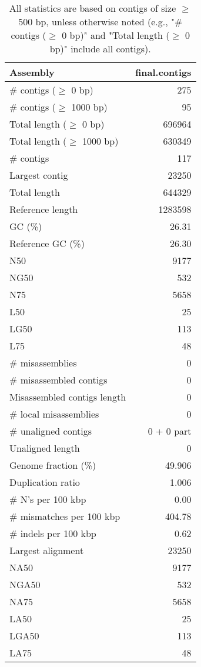 \documentclass[12pt,a4paper]{article}
\begin{document}
\begin{table}[ht]
\begin{center}
\caption{All statistics are based on contigs of size $\geq$ 500 bp, unless otherwise noted (e.g., "\# contigs ($\geq$ 0 bp)" and "Total length ($\geq$ 0 bp)" include all contigs).}
\begin{tabular}{|l*{1}{|r}|}
\hline
Assembly & final.contigs \\ \hline
\# contigs ($\geq$ 0 bp) & 275 \\ \hline
\# contigs ($\geq$ 1000 bp) & 95 \\ \hline
Total length ($\geq$ 0 bp) & 696964 \\ \hline
Total length ($\geq$ 1000 bp) & 630349 \\ \hline
\# contigs & 117 \\ \hline
Largest contig & 23250 \\ \hline
Total length & 644329 \\ \hline
Reference length & 1283598 \\ \hline
GC (\%) & 26.31 \\ \hline
Reference GC (\%) & 26.30 \\ \hline
N50 & 9177 \\ \hline
NG50 & 532 \\ \hline
N75 & 5658 \\ \hline
L50 & 25 \\ \hline
LG50 & 113 \\ \hline
L75 & 48 \\ \hline
\# misassemblies & 0 \\ \hline
\# misassembled contigs & 0 \\ \hline
Misassembled contigs length & 0 \\ \hline
\# local misassemblies & 0 \\ \hline
\# unaligned contigs & 0 + 0 part \\ \hline
Unaligned length & 0 \\ \hline
Genome fraction (\%) & 49.906 \\ \hline
Duplication ratio & 1.006 \\ \hline
\# N's per 100 kbp & 0.00 \\ \hline
\# mismatches per 100 kbp & 404.78 \\ \hline
\# indels per 100 kbp & 0.62 \\ \hline
Largest alignment & 23250 \\ \hline
NA50 & 9177 \\ \hline
NGA50 & 532 \\ \hline
NA75 & 5658 \\ \hline
LA50 & 25 \\ \hline
LGA50 & 113 \\ \hline
LA75 & 48 \\ \hline
\end{tabular}
\end{center}
\end{table}
\end{document}
